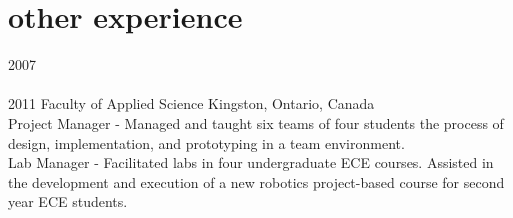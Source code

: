 
\section{other experience}
\begin{entrylist}
\entry
  {2007\\\faChevronDown\\2011}
  {Faculty of Applied Science}
  {Kingston, Ontario, Canada}
  {\\
  {\headingfont Project Manager} - Managed and taught six teams of four students the process of design, implementation, and prototyping in a team environment.\\
  {\headingfont Lab Manager} - Facilitated labs in four undergraduate ECE courses. Assisted in the development and execution of a new robotics project-based course for second year ECE students.}
\end{entrylist}